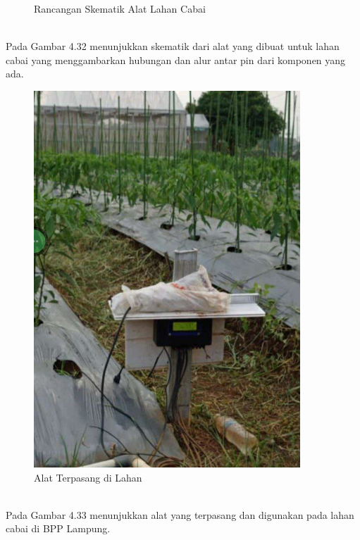 \begin{flushleft}
\begin{justify}
\begin{figure}[ht]
            \caption{Rancangan Skematik Alat Lahan Cabai}
        \end{figure}
        \\Pada Gambar 4.32 menunjukkan skematik dari alat yang dibuat untuk lahan cabai yang menggambarkan hubungan
        dan alur antar pin dari komponen yang ada.
        \vspace{8cm}
        \begin{figure}[ht]
            \centering
            \includegraphics[width=10cm]{images/bab 4/gunain.jpeg}
            \caption{Alat Terpasang di Lahan}
        \end{figure}
        \\Pada Gambar 4.33 menunjukkan alat yang terpasang dan digunakan pada lahan cabai di BPP Lampung.\\


\end{justify}
\end{flushleft}
